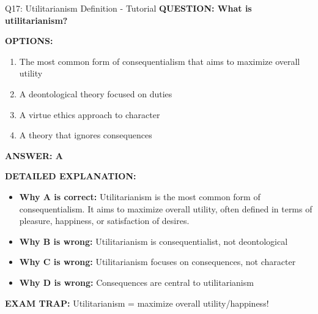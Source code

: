 \documentclass[8pt]{beamer}
\begin{document}
	\begin{frame}{Q17: Utilitarianism Definition - Tutorial}
		\fontsize{6.5}{7.5}\selectfont
		\textbf{QUESTION: What is utilitarianism?}
		
		\vspace{0.1cm}
		\textbf{OPTIONS:}
		\begin{enumerate}
			\item The most common form of consequentialism that aims to maximize overall utility
			\item A deontological theory focused on duties
			\item A virtue ethics approach to character
			\item A theory that ignores consequences
		\end{enumerate}
		
		\vspace{0.1cm}
		\textcolor{myblue}{\textbf{ANSWER: A}}
		
		\vspace{0.1cm}
		\textbf{DETAILED EXPLANATION:}
		\begin{itemize}
			\item \textbf{Why A is correct:} Utilitarianism is the most common form of consequentialism. It aims to maximize overall utility, often defined in terms of pleasure, happiness, or satisfaction of desires.
			\item \textbf{Why B is wrong:} Utilitarianism is consequentialist, not deontological
			\item \textbf{Why C is wrong:} Utilitarianism focuses on consequences, not character
			\item \textbf{Why D is wrong:} Consequences are central to utilitarianism
		\end{itemize}
		
		\textcolor{myred}{\textbf{EXAM TRAP:}} Utilitarianism = \textcolor{myblue}{maximize overall utility/happiness}!
	\end{frame}
	
\end{document}
